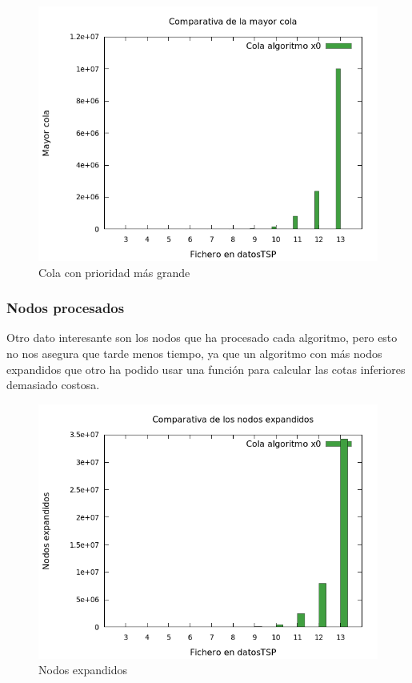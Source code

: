 \begin{figure}[H]
    \centering
    \includegraphics[scale=0.65]{../TSP/Graficas/graficaColaMaxima.png}
    \caption{Cola con prioridad más grande}
\end{figure}


\subsubsection{Nodos procesados}
Otro dato interesante son los nodos que ha procesado cada algoritmo, pero esto no nos asegura
que tarde menos tiempo, ya que un algoritmo con más nodos expandidos que otro ha podido usar una
función para calcular las cotas inferiores demasiado costosa.
\begin{figure}[H]
    \centering
    \includegraphics[scale=0.65]{../TSP/Graficas/graficaNodos.png}
    \caption{Nodos expandidos}
\end{figure}



